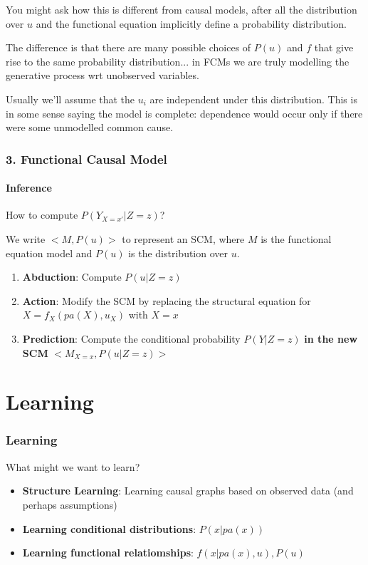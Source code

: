 \documentclass{beamer}
\begin{document}
\begin{frame}
{You might ask how this is different from causal models, after all the distribution over $u$ and the functional equation implicitly define a probability distribution.

The difference is that there are many possible choices of $P(u)$ and $f$ that give rise to the same probability distribution... in FCMs we are truly modelling the generative process wrt unobserved variables.

Usually we'll assume that the $u_i$ are independent under this distribution. This is in some sense saying the model is complete: dependence would occur only if there were some unmodelled common cause.
}
\end{frame}

\begin{frame}
\frametitle{3. Functional Causal Model}
\framesubtitle{Inference}
How to compute $P(Y_{X=x'}|Z=z)$?

We write $<M, P(u)>$ to represent an SCM, where $M$ is the functional equation model and $P(u)$ is the distribution over $u$.
\begin{enumerate}
	\item \textbf{Abduction}: Compute $P(u|Z=z)$
	\item \textbf{Action}: Modify the SCM by replacing the structural equation for $X = f_X(pa(X), u_X)$ with $X = x$
	\item \textbf{Prediction}: Compute the conditional probability $P(Y|Z=z)$ \textbf{in the new SCM} $<M_{X=x}, P(u|Z=z)>$
\end{enumerate}
\end{frame}

\section{Learning}

\begin{frame}
\frametitle{Learning}
What might we want to learn?

\bigskip
\begin{itemize}
	\item \textbf{Structure Learning}: Learning causal graphs based on observed data (and perhaps assumptions)
	\item \textbf{Learning conditional distributions}: $P(x|pa(x))$
	\item \textbf{Learning functional relatiomships}: $f(x|pa(x), u), P(u)$
\end{itemize}

\end{frame}
\end{document}
